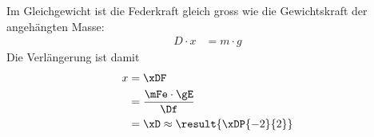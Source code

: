 Im Gleichgewicht ist die Federkraft gleich gross wie die Gewichtskraft der angehängten Masse:
\begin{align}
 D\cdot x &= m\cdot g
\end{align}
Die Verlängerung ist damit
\begin{align}
 x &= \xDF \\
   &= \frac{\mFe\cdot\gE}{\Df} \\
   &= \xD \approx \result{\xDP{-2}{2}}
\end{align}
